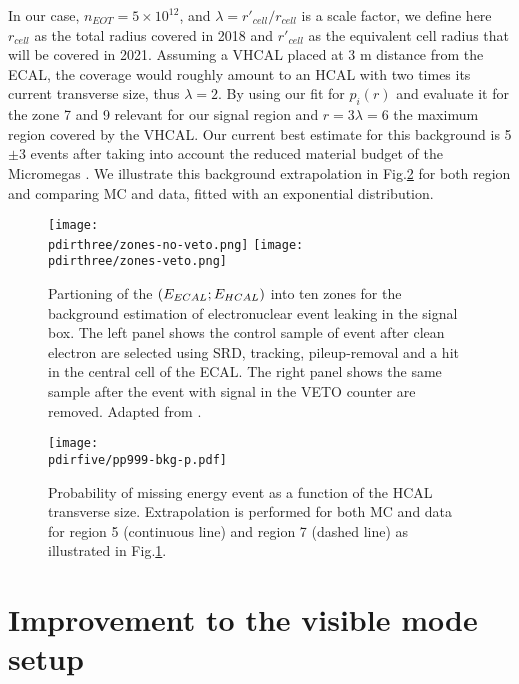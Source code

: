 In our case, $n_{EOT} = 5 \times 10^{12}$, and $\lambda = r'_{cell}/r_{cell}$ is a scale factor, we define here $r_{cell}$ as the total radius covered in 2018 and $r'_{cell}$ as the equivalent cell radius that will be covered in 2021. Assuming a VHCAL placed at 3 \si{\meter} distance from the ECAL, the coverage would roughly amount to an HCAL with two times its current transverse size, thus $\lambda = 2$. By using our fit for $p_i(r)$ and evaluate it for the zone 7 and 9 relevant for our signal region and $r = 3\lambda = 6$ the maximum region covered by the VHCAL. Our current best estimate for this background is 5$\pm$3 events after taking into account the reduced material budget of the Micromegas \cite{pdegen-thesis}. We illustrate this background extrapolation in Fig.\ref{fig:enucl-bkg-extrapolation} for both region and comparing MC and data, fitted with an exponential distribution.


\begin{figure}[tbh!]
  \centering
  \texttt{[image: \\pdirthree/zones-no-veto.png]}
  \texttt{[image: \\pdirthree/zones-veto.png]}
  \caption[electronuclear background estimation]{Partioning of the $(E_{ECAL};E_{HCAL})$ into ten zones for the background estimation of electronuclear event leaking in the signal box. The left panel shows the control sample of event after clean electron are selected using SRD, tracking, pileup-removal and a hit in the central cell of the ECAL. The right panel shows the same sample after the event with signal in the VETO counter are removed. Adapted from \cite{na64-neutrals-study}.}
  \label{fig:enucl-bkg-estimation}
\end{figure}

\begin{figure}[bth!]
  \centering
  \texttt{[image: \\pdirfive/pp999-bkg-p.pdf]}
  \caption[background extrpolation invisible mode]{Probability of missing energy event as a function of the HCAL transverse size. Extrapolation is performed for both MC and data for region 5 (continuous line) and region 7 (dashed line) as illustrated in Fig.\ref{fig:enucl-bkg-estimation}.}
  \label{fig:enucl-bkg-extrapolation}
\end{figure}

\clearpage

\section{Improvement to the visible mode setup}
\label{ch5:sec:new-vismode-setup}

